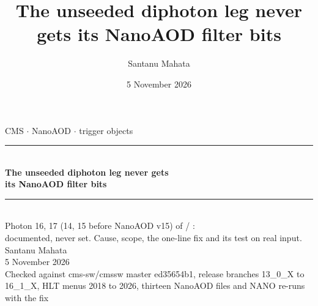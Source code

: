 

\title{\textbf{The unseeded diphoton leg never gets its NanoAOD filter bits}}
\author{Santanu Mahata}
\date{5 November 2026}



{
\begin{frame}[plain]
  \vspace*{0.9cm}
  \begin{center}
    {\footnotesize\color{cmsaccent} CMS $\cdot$ NanoAOD $\cdot$ trigger objects}\\[8pt]
    {\color{cmsaccent}\rule{0.7\linewidth}{1.5pt}}\\[10pt]
    {\Large\bfseries\color{white} The unseeded diphoton leg never gets}\\[6pt]
    {\Large\bfseries\color{white} its NanoAOD filter bits}\\[10pt]
    {\color{cmsaccent}\rule{0.7\linewidth}{1.5pt}}\\[12pt]
    {\small\color{lightgrey} Photon  16, 17 (14, 15 before NanoAOD v15) of
      / :\\
     documented, never set. Cause, scope, the one-line fix and its test on real input.}\\[16pt]
    {\large\color{white} Santanu Mahata}\\[4pt]
    {\footnotesize\color{cmsgold} 5 November 2026}\\[10pt]
    {\tiny\color{lightgrey} Checked against cms-sw/cmssw master ed35654b1, release branches 13\_0\_X to 16\_1\_X,
     HLT menus 2018 to 2026, thirteen NanoAOD files and NANO re-runs with the fix}
  \end{center}
\end{frame}
}


